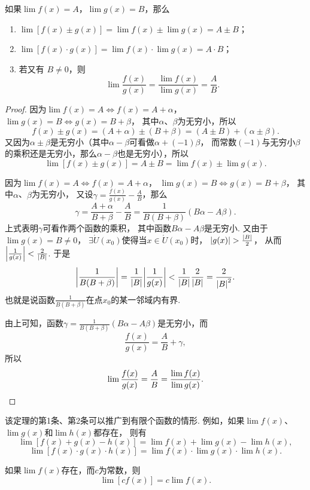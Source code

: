 \begin{theorem}\label{theorem:极限.极限的四则运算法则}
如果\(\lim f(x)=A\)，\(\lim g(x)=B\)，那么\begin{enumerate}
	\item \(\lim [f(x) \pm g(x)] = \lim f(x) \pm \lim g(x) = A \pm B\)；
	\item \(\lim [f(x) \cdot g(x)] = \lim f(x) \cdot \lim g(x) = A \cdot B\)；
	\item 若又有 \(B \neq 0\)，则\[
		\lim \frac{f(x)}{g(x)} = \frac{\lim f(x)}{\lim g(x)} = \frac{A}{B}.
	\]
\end{enumerate}
\begin{proof}
因为\(\lim f(x)=A \iff f(x)=A+\alpha\)，\(\lim g(x)=B \iff g(x)=B+\beta\)，
其中\(\alpha\)、\(\beta\)为无穷小，所以\[
	f(x) \pm g(x) = (A+\alpha)\pm(B+\beta) = (A \pm B) + (\alpha \pm \beta).
\]
又因为\(\alpha\pm\beta\)是无穷小（其中\(\alpha-\beta\)可看做\(\alpha+(-1)\beta\)，
而常数\((-1)\)与无穷小\(\beta\)的乘积还是无穷小，那么\(\alpha-\beta\)也是无穷小），所以\[
	\lim [f(x) \pm g(x)] = A \pm B = \lim f(x) \pm \lim g(x).
\]

因为\(\lim f(x)=A \iff f(x)=A+\alpha\)，
\(\lim g(x)=B \iff g(x)=B+\beta\)，
其中\(\alpha\)、\(\beta\)为无穷小，
又设\(\gamma = \frac{f(x)}{g(x)} - \frac{A}{B}\)，那么\[
	\gamma = \frac{A+\alpha}{B+\beta} - \frac{A}{B}
	= \frac{1}{B(B+\beta)} (B \alpha - A \beta).
\]
上式表明\(\gamma\)可看作两个函数的乘积，
其中函数\(B \alpha - A \beta\)是无穷小.
又由于\(\lim g(x) = B \neq 0\)，
\(\exists \mathring{U}(x_0)\)使得当\(x\in\mathring{U}(x_0)\)时，
\(\abs{g(x)}>\frac{\abs{B}}{2}\)，
从而\(\abs{\frac{1}{g(x)}}<\frac{2}{\abs{B}}\).
于是\[
	\abs{\frac{1}{B(B+\beta)}}
	=\frac{1}{\abs{B}} \abs{\frac{1}{g(x)}}
	<\frac{1}{\abs{B}} \frac{2}{\abs{B}}
	=\frac{2}{\abs{B}^2}.
\]
也就是说函数\(\frac{1}{B(B+\beta)}\)在点\(x_0\)的某一邻域内有界.

由上可知，函数\(\gamma = \frac{1}{B(B+\beta)} (B \alpha - A \beta)\)是无穷小，而\[
\frac{f(x)}{g(x)} = \frac{A}{B} + \gamma,
\]所以\[
\lim\frac{f(x)}{g(x)} = \frac{A}{B} = \frac{\lim f(x)}{\lim g(x)}.
\qedhere
\]
\end{proof}
\end{theorem}

该定理的第1条、第2条可以推广到有限个函数的情形.
例如，如果\(\lim f(x)\)、\(\lim g(x)\)和\(\lim h(x)\)都存在，
则有\[
	\lim[f(x) + g(x) - h(x)] = \lim f(x) + \lim g(x) - \lim h(x),
\]\[
	\lim[f(x) \cdot g(x) \cdot h(x)] = \lim f(x) \cdot \lim g(x) \cdot \lim h(x).
\]

\begin{corollary}
如果\(\lim f(x)\)存在，而\(c\)为常数，则\[\lim [c f(x)] = c \lim f(x).\]
\end{corollary}

